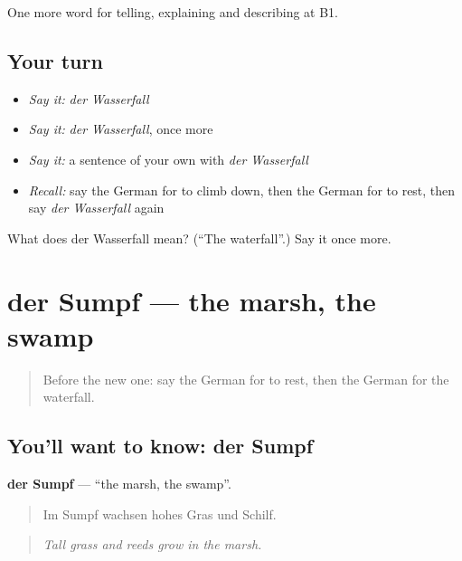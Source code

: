 \begin{grammarlens}[title={What you've built}]
One more word for telling, explaining and describing at B1.
\end{grammarlens}

\subsection*{Your turn}
\begin{itemize}
\raggedright
  \item \emph{Say it:} \emph{der Wasserfall}
  \item \emph{Say it:} \emph{der Wasserfall}, once more
  \item \emph{Say it:} a sentence of your own with \emph{der Wasserfall}
  \item \emph{Recall:} say the German for to climb down, then the German for to rest, then say \emph{der Wasserfall} again
\end{itemize}

\begin{tcolorbox}[breakable,colback=teal!4,colframe=teal!35!black,title={Before you move on}]
What does der Wasserfall mean? (\textquotedblleft{}The waterfall\textquotedblright{}.) Say it once more.
\end{tcolorbox}
\section[der Sumpf]{der Sumpf — the marsh, the swamp}

\label{lesson:GE-C455-sumpf}



\begin{quote}
Before the new one: say the German for to rest, then the German for the waterfall.
\end{quote}

\subsection*{You'll want to know: der Sumpf}
\textbf{der Sumpf} — \textquotedblleft{}the marsh, the swamp\textquotedblright{}.

\begin{quote}
Im Sumpf wachsen hohes Gras und Schilf.
\end{quote}

\begin{quote}
\emph{Tall grass and reeds grow in the marsh.}
\end{quote}

